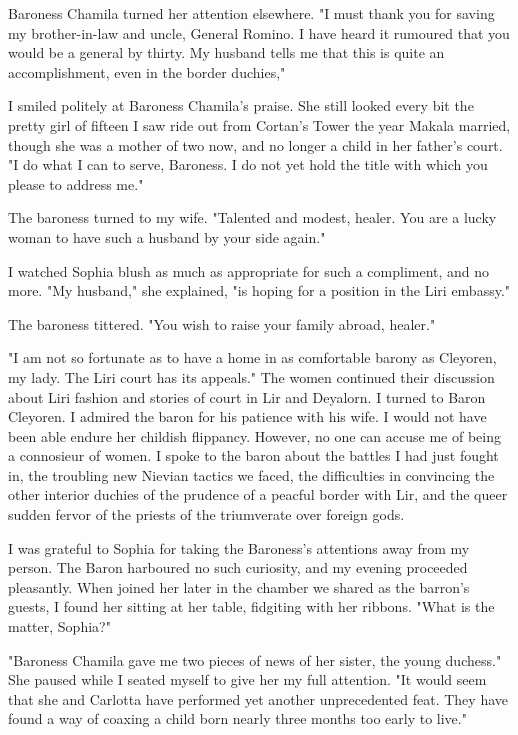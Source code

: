 \documentclass{article}
\begin{document}
Baroness Chamila turned her attention elsewhere. "I must thank you for saving my brother-in-law and uncle, General Romino. I have heard it rumoured that you would be a general by thirty. My husband tells me that this is quite an accomplishment, even in the border duchies," 

I smiled politely at Baroness Chamila's praise. She still looked every bit the pretty girl of fifteen I saw ride out from Cortan's Tower the year Makala married, though she was a mother of two now, and no longer a child in her father's court. "I do what I can to serve, Baroness. I do not yet hold the title with which you please to address me."

The baroness turned to my wife. "Talented and modest, healer. You are a lucky woman to have such a husband by your side again." 

I watched Sophia blush as much as appropriate for such a compliment, and no more. "My husband," she explained, "is hoping for a position in the Liri embassy."

The baroness tittered. "You wish to raise your family abroad, healer." 

"I am not so fortunate as to have a home in as comfortable barony as Cleyoren, my lady. The Liri court has its appeals." The women continued their discussion about Liri fashion and stories of court in Lir and Deyalorn. I turned to Baron Cleyoren. I admired the baron for his patience with his wife. I would not have been able endure her childish flippancy. However, no one can accuse me of being a connosieur of women. I spoke to the baron about the battles I had just fought in, the troubling new Nievian tactics we faced, the difficulties in convincing the other interior duchies of the prudence of a peacful border with Lir, and the queer sudden fervor of the priests of the triumverate over foreign gods.

I was grateful to Sophia for taking the Baroness's attentions away from my person. The Baron harboured no such curiosity, and my evening proceeded pleasantly. When joined her later in the chamber we shared as the barron's guests, I found her sitting at her table, fidgiting with her ribbons. "What is the matter, Sophia?"

"Baroness Chamila gave me two pieces of news of her sister, the young duchess." She paused while I seated myself to give her my full attention. "It would seem that she and Carlotta have performed yet another unprecedented feat. They have found a way of coaxing a child born nearly three months too early to live."
\end{document}

